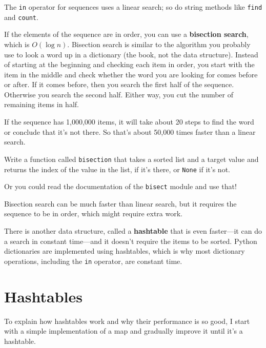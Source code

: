\documentclass[10pt]{book}
\begin{document}
The {\tt in} operator for sequences uses a linear search; so do string
methods like {\tt find} and {\tt count}.

If the elements of the sequence are in order, you can use a {\bf
  bisection search}, which is $O(\log n)$.  Bisection search is
similar to the algorithm you probably use to look a word up in a
dictionary (the book, not the data structure).  Instead of starting at
the beginning and checking each item in order, you start with the item
in the middle and check whether the word you are looking for comes
before or after.  If it comes before, then you search the first half
of the sequence.  Otherwise you search the second half.  Either way,
you cut the number of remaining items in half.  

If the sequence has 1,000,000 items, it will take about 20 steps to
find the word or conclude that it's not there.  So that's about 50,000
times faster than a linear search.

\begin{ex}

Write a function called {\tt bisection} that takes a sorted list
and a target value and returns the index of the value
in the list, if it's there, or {\tt None} if it's not.


Or you could read the documentation of the {\tt bisect} module
and use that!

\end{ex}

Bisection search can be much faster than linear search, but
it requires the sequence to be in order, which might require
extra work.

There is another data structure, called a {\bf hashtable} that
is even faster---it can do a search in constant time---and it
doesn't require the items to be sorted.  Python dictionaries
are implemented using hashtables, which is why most dictionary
operations, including the {\tt in} operator, are constant time.


\section{Hashtables}
\label{hashtable}

To explain how hashtables work and why their performance is so
good, I start with a simple implementation of a map and
gradually improve it until it's a hashtable.
\end{document}
